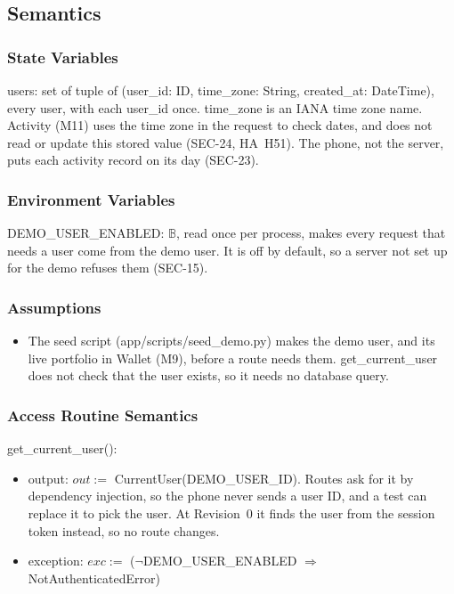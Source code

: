 \documentclass[12pt, titlepage]{article}
\begin{document}
\subsection{Semantics}

\subsubsection{State Variables}

\noindent users: set of tuple of (user\_id: ID, time\_zone: String,
created\_at: DateTime), every user, with each user\_id once. time\_zone is an
IANA time zone name. Activity (M11) uses the time zone in the request
to check dates, and does not read or update this stored value (SEC-24,
HA~H51). The phone, not the server, puts each activity record on its day
(SEC-23).

\subsubsection{Environment Variables}

\noindent DEMO\_USER\_ENABLED: $\mathbb{B}$, read once per process, makes every
request that needs a user come from the demo user. It is off by default, so a
server not set up for the demo refuses them (SEC-15).

\subsubsection{Assumptions}

\begin{itemize}
\item The seed script (app/scripts/seed\_demo.py) makes the demo user, and its
  live portfolio in Wallet (M9), before a route needs them. get\_current\_user
  does not check that the user exists, so it needs no database query.
\end{itemize}

\subsubsection{Access Routine Semantics}

\noindent get\_current\_user():
\begin{itemize}
\item output: $out :=$ CurrentUser(DEMO\_USER\_ID). Routes ask for it by
  dependency injection, so the phone never sends a user ID, and a test can
  replace it to pick the user. At Revision~0 it finds the user from the session
  token instead, so no route changes.
\item exception: $exc :=$ ($\neg$DEMO\_USER\_ENABLED $\Rightarrow$
  NotAuthenticatedError)
\end{itemize}
\end{document}
